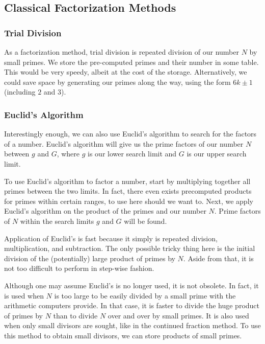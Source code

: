 \documentclass{article}
\begin{document}
\subsection*{Classical Factorization Methods}

\subsubsection*{ Trial Division }
\par As a factorization method, trial division is repeated division of our number $N$ by
small primes. We store the pre-computed primes and their number in some table. This would be very
speedy, albeit at the cost of the storage. Alternatively, we could save space by generating our
primes along the way, using the form $6k \pm 1$ (including $2$ and $3$).

\subsubsection*{ Euclid's Algorithm }
\par Interestingly enough, we can also use Euclid's algorithm to search for the factors of a
number. Euclid's algorithm will give us the prime factors of our number $N$ between $g$ and $G$, where
$g$ is our lower search limit and $G$ is our upper search limit.

\par To use Euclid's algorithm to factor a number, start by multiplying together all primes between
the two limits. In fact, there even exists precomputed products for primes within certain ranges, to
use here should we want to. Next, we apply Euclid's algorithm on the product of the primes and our number
$N$. Prime factors of $N$ within the search limits $g$ and $G$ will be found.

\par Application of Euclid's is fast because it simply is repeated division, multiplication, and
subtraction. The only possible tricky thing here is the initial division of the (potentially) large product
of primes by $N$. Aside from that, it is not too difficult to perform in step-wise fashion.

\par Although one may assume Euclid's is no longer used, it is not obsolete. In fact, it is used when $N$ is
too large to be easily divided by a small prime with the arithmetic computers provide. In that case, it
is faster to divide the huge product of primes by $N$ than to divide $N$ over and over by small primes.
It is also used when only small divisors are sought, like in the continued fraction method. To use this method
to obtain small divisors, we can store products of small primes.
\end{document}
